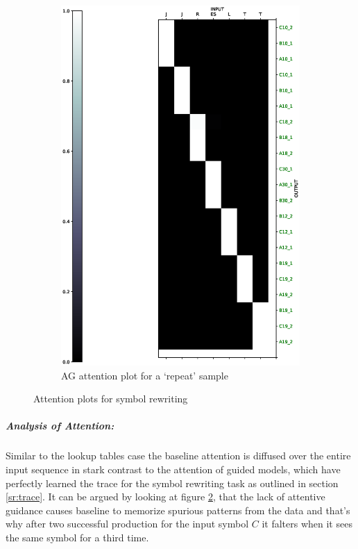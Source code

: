 \begin{figure}[ht]
\begin{subfigure}[b]{0.5\linewidth}
		\includegraphics[width=0.95\linewidth]{./figs/sr/attn/guided-eps}
		\caption{AG attention plot for a \lq repeat\rq{} sample } 
		\label{repeat_guide} 
		\vspace{2ex}
	\end{subfigure}
	\caption{Attention plots for symbol rewriting}
	\label{sr_repeat}
\end{figure}
\subparagraph{Analysis of Attention:} Similar to the lookup tables case the baseline attention is diffused over the entire input sequence in stark contrast to the attention of guided models, which have perfectly learned the trace for the symbol rewriting task as outlined in section \ref{sr:trace}. It can be argued by looking at figure \ref{sr_repeat}, that the lack of attentive guidance causes baseline to memorize spurious patterns from the data and that's why after two successful production for the input symbol $C$ it falters when it sees the same symbol for a third time.

